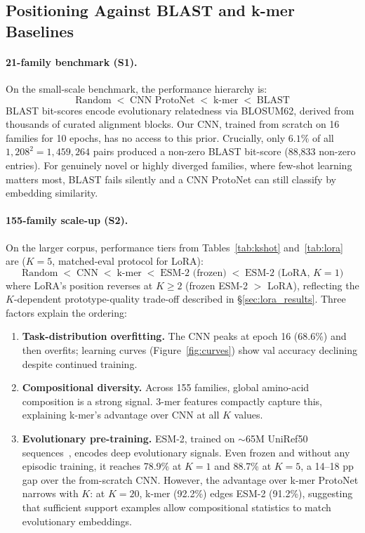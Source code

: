 \documentclass[11pt,a4paper]{article}
\begin{document}
\subsection{Positioning Against BLAST and k-mer Baselines}
\label{sec:kmer_analysis}

\paragraph{21-family benchmark (S1).}
On the small-scale benchmark, the performance hierarchy is:
\[
  \text{Random} \;<\; \text{CNN ProtoNet} \;<\; \text{k-mer} \;<\; \text{BLAST}
\]
BLAST bit-scores encode evolutionary relatedness via BLOSUM62, derived from
thousands of curated alignment blocks.  Our CNN, trained from scratch on 16
families for 10 epochs, has no access to this prior.  Crucially, only
$\mathbf{6.1\%}$ of all $1{,}208^2 = 1{,}459{,}264$ pairs produced a non-zero
BLAST bit-score (88,833 non-zero entries).  For genuinely novel or highly
diverged families, where few-shot learning matters most, BLAST fails silently
and a CNN ProtoNet can still classify by embedding similarity.

\paragraph{155-family scale-up (S2).}
On the larger corpus, performance tiers from Tables~\ref{tab:kshot}
and~\ref{tab:lora} are ($K=5$, matched-eval protocol for LoRA):
\[
  \text{Random} \;<\; \text{CNN} \;<\; \text{k-mer} \;<\;
  \text{ESM-2 (frozen)} \;<\; \text{ESM-2 (LoRA, }K{=}1\text{)}
\]
where LoRA's position reverses at $K \geq 2$ (frozen ESM-2 $>$ LoRA), reflecting
the $K$-dependent prototype-quality trade-off described in \S\ref{sec:lora_results}.
Three factors explain the ordering:
\begin{enumerate}[noitemsep,leftmargin=*]
  \item \textbf{Task-distribution overfitting.} The CNN peaks at epoch 16 (68.6\%)
        and then overfits; learning curves (Figure~\ref{fig:curves}) show val
        accuracy declining despite continued training.
  \item \textbf{Compositional diversity.} Across 155 families, global amino-acid
        composition is a strong signal.  3-mer features compactly capture this,
        explaining k-mer's advantage over CNN at all $K$ values.
  \item \textbf{Evolutionary pre-training.} ESM-2, trained on $\sim$65M UniRef50
        sequences~\cite{lin2023evolutionary}, encodes deep evolutionary signals.  Even frozen and without
        any episodic training, it reaches 78.9\% at $K=1$ and 88.7\% at $K=5$, a 14--18 pp gap over the from-scratch CNN.  However, the advantage
        over k-mer ProtoNet narrows with $K$: at $K=20$, k-mer (92.2\%) edges
        ESM-2 (91.2\%), suggesting that sufficient support examples allow
        compositional statistics to match evolutionary embeddings.
\end{enumerate}
\end{document}
